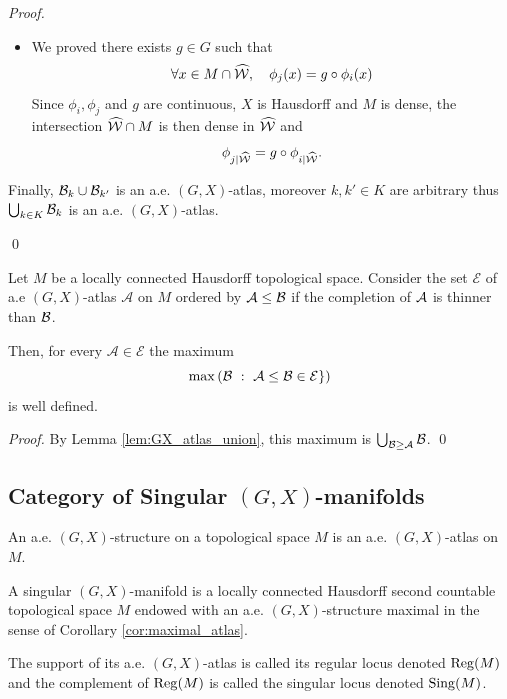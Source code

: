\begin{proof}
\begin{itemize}
					\item We proved there exists $g\in G$  such that
					$$\forall x\in M\cap \widehat {\mathcal W}, \quad  \phi_j(x)=g\circ \phi_i(x)$$
					Since $\phi_i,\phi_j$ and $g$ are continuous, $X$ is Hausdorff and $M$ is dense, 
					the intersection $\widehat {\mathcal W}\cap M$ is then dense in 
					$\widehat {\mathcal W}$ and
					$$\phi_{j|\widehat{\mathcal W}}=g\circ \phi_{i|\widehat{\mathcal W}}.$$
					\end{itemize}
					Finally, $\mathcal B_k\cup \mathcal B_{k'}$ is an a.e. $(G,X)$-atlas, moreover  $k,k'\in K$ are arbitrary thus $\bigcup_{k\in K} \mathcal B_k$ is an a.e. $(G,X)$-atlas.
					
					\qed\end{proof}
					
					
					\begin{cor} \label{cor:maximal_atlas}
					Let $M$ be a locally connected Hausdorff topological space. 
					Consider the set $\mathcal E$ of  a.e $(G,X)$-atlas $\mathcal A$ on $M$ ordered by $\mathcal A\leq \mathcal B$ if the completion of $\mathcal A$ is thinner than $\mathcal B$.
					
					Then, for every $\mathcal A \in \mathcal E$ the maximum $$ \max\,(\mathcal B ~:~ \mathcal A\leq \mathcal B \in \mathcal E\})$$
					is well defined.
					\end{cor}
                    \begin{proof}
                      By Lemma \ref{lem:GX_atlas_union}, this maximum is  $\bigcup_{\mathcal B\geq \mathcal A}\mathcal B$.
                    \qed\end{proof}					
                    
                    \subsection{Category of Singular $(G,X)$-manifolds}
                    
                    \begin{defi}\label{def:structure_topological_space_atlas} An a.e. $(G,X)$-structure on a topological space $M$ is an a.e. $(G,X)$-atlas on $M$.                     
                    \end{defi}
                    
					\begin{defi}\label{def:singular_manifold_locally_connected} A singular $(G,X)$-manifold is a locally connected Hausdorff second countable topological space $M$ endowed with an a.e. $(G,X)$-structure maximal in the sense of Corollary \ref{cor:maximal_atlas}.
					
					The support of its a.e. $(G,X)$-atlas is called its regular locus denoted $\mathrm{Reg}(M)$ and the complement of $\mathrm{Reg}(M)$ is called the singular locus denoted $\mathrm{Sing}(M)$.
					\end{defi}
                    
